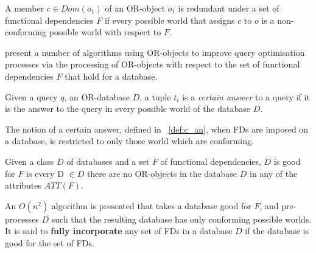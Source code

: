 \begin{definition}
\begin{rm}
A member $c \in Dom(o_1)$ of an OR-object $o_1$ is redundant under a set of
functional dependencies $F$ if every possible world that assigns $c$ to $o$ is
a non-conforming possible world with respect to $F$.
\end{rm}
\end{definition}

\cite{vn95} present a number of algorithms using OR-objects to improve query 
optimisation processes via the processing of OR-objects with respect to the
set of functional dependencies $F$ that hold for a database. 

\begin{definition}\label{def:c_an}
\begin{rm}
Given a query $q$, an OR-database $D$, a tuple $t_i$ is a {\em certain
answer} to a query if it is the answer to the query in every
possible world of the database $D$.
\end{rm}
\end{definition}

The notion of a certain answer, defined in ~\ref{def:c_an}, when
FDs are imposed on a database, is restricted to only those
world which are conforming.

\begin{definition}
\begin{rm}
Given a class $D$ of databases and a set $F$ of functional dependencies,
$D$ is good for $F$ is every D $\in D$ there are no OR-objects in the
database $D$ in any of the attributes $ATT(F)$.
\end{rm}
\end{definition}

An $O(n^2)$ algorithm is presented that takes a database good for $F$, and
pre-processes $D$ such that the resulting database has only conforming
possible worlds.  It is said to {\bf fully incorporate} any set of FDs in
a database $D$ if the database is good for the set of FDs.\\


